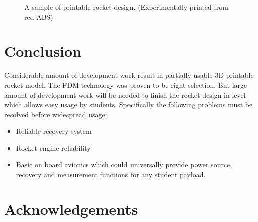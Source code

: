 \documentclass{poster16}
\begin{document}
\begin{figure}[ht]
\begin{center}
\caption{A sample of printable rocket design. (Experimentally printed from red ABS)} 
\label{fig:metal_engine}
\end{center}
\end{figure}

\section{Conclusion}

Considerable amount of development work result in partially usable 3D printable rocket model. The FDM technology was proven to be right selection. But large amount of development work will be needed to finish the rocket design in level which allows easy usage by students. 
Specifically the following problems must be resolved before widespread usage: 

\begin{itemize}
\item Reliable recovery system
\item Rocket engine reliability 
\item Basic on board avionics which could universally provide power source, recovery and measurement functions for any student payload. 
\end{itemize}

\section*{Acknowledgements}
\end{document}
